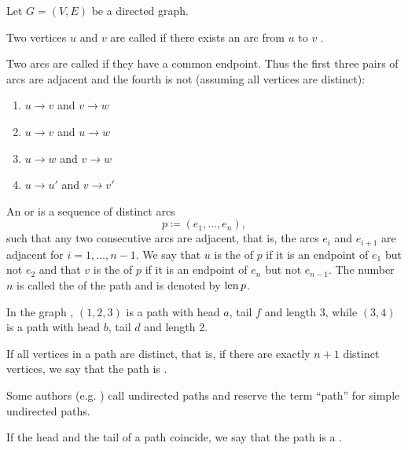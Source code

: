 \begin{definition}\label{def:graph_paths}
  Let \( G = (V, E) \) be a directed graph.

  \begin{defenum}
     Two vertices \( u \)  and \( v \)  are called  if there exists an arc from \( u \)  to \( v \) .

    \cite[chapter 1, section 1.4]{Gondran1984} Two arcs are called  if they have a common endpoint. Thus the first three pairs of arcs are adjacent and the fourth is not (assuming all vertices are distinct):
    \begin{enumerate}
      \item \( u \to v \) and \( v \to w \)
      \item \( u \to v \) and \( u \to w \)
      \item \( u \to w \) and \( v \to w \)
      \item \( u \to u' \) and \( v \to v' \)
    \end{enumerate}

    \cite[chapter 1, section 3.1]{Gondran1984} An  or  is a sequence of distinct arcs
    \begin{equation*}
      p \coloneqq ( e_1, \ldots, e_n ),
    \end{equation*}
    such that any two consecutive arcs are adjacent, that is, the arcs \( e_i \) and \( e_{i+1} \) are adjacent for \( i = 1, \ldots, n - 1 \). We say that \( u \) is the  of \( p \) if it is an endpoint of \( e_1 \) but not \( e_2 \) and that \( v \) is the  of \( p \) if it is an endpoint of \( e_n \) but not \( e_{n-1} \). The number $n$ is called the  of the path and is denoted by \( \operatorname{len} p \).

    In the graph , \( (1, 2, 3) \) is a path with head \( a \), tail \( f \) and length 3, while \( (3, 4) \) is a path with head \( b \), tail \( d \) and length 2.

    If all vertices in a path are distinct, that is, if there are exactly $n + 1$ distinct vertices, we say that the path is .

    Some authors (e.g. \cite[section 5.2]{Erickson2019}) call undirected paths  and reserve the term \enquote{path} for simple undirected paths.

    If the head and the tail of a path coincide, we say that the path is a .


\end{defenum}
\end{definition}
